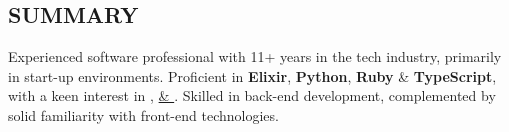 \subsection*{SUMMARY}

\tbullet Experienced software professional with 11+ years in the tech industry, primarily in start-up environments. \newline
\tbullet Proficient in \textbf{Elixir}, \textbf{Python}, \textbf{Ruby} \& \textbf{TypeScript},
         with a keen interest in \href{https://github.com/ethan605/aws-vpn-client}{},
         \href{https://xkpasswd.ethanify.me}{ \& }. \newline
\tbullet Skilled in back-end development, complemented by solid familiarity with front-end technologies.
